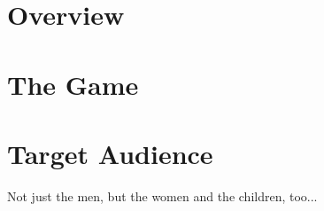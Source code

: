 \section{Overview}

\lipsum[1]

\section{The Game}

\lipsum[2]

\section{Target Audience}

Not just the men, but the women and the children, too...

\lipsum[3]